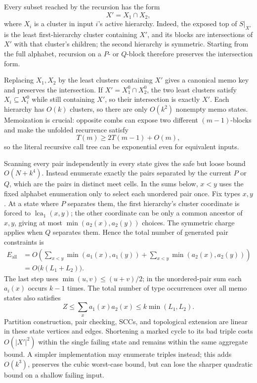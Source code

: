 Every subset reached by the recursion has the form
\begin{equation}
  X'=X_1\cap X_2,
 \label{eq:eta-cluster-intersection}
\end{equation}
where \(X_i\) is a cluster in input \(i\)'s active hierarchy.  Indeed, the
exposed top of \(S|_{X'}\) is the least first-hierarchy cluster containing
\(X'\), and its blocks are intersections of \(X'\) with that cluster's
children; the second hierarchy is symmetric.  Starting from the full
alphabet, recursion on a \(P\)- or \(Q\)-block therefore preserves the
intersection form.

Replacing \(X_1,X_2\) by the least clusters containing \(X'\) gives a
canonical memo key and preserves the intersection.  If
\(X'=X_1^0\cap X_2^0\), the two least clusters satisfy
\(X_i\subseteq X_i^0\) while still containing \(X'\), so their intersection
is exactly \(X'\).  Each hierarchy has \(O(k)\) clusters, so there are only
\(O(k^2)\) nonempty memo states.  Memoization is crucial:
opposite combs can expose two different \((m-1)\)-blocks and make the unfolded
recurrence satisfy
\begin{equation}
  T(m)\ge2T(m-1)+O(m),
 \label{eq:eta-unmemoized}
\end{equation}
so the literal recursive call tree can be exponential even for equivalent
inputs.

Scanning every pair independently in every state gives the safe but loose
bound \(O(N+k^4)\).  Instead enumerate exactly the pairs separated by the
current \(P\) or \(Q\), which are the pairs in distinct meet cells.  In the
sums below, \(x<y\) uses the fixed alphabet enumeration only to select each
unordered pair once.  Fix types \(x,y\).  At a state where \(P\) separates
them, the first hierarchy's
cluster coordinate is forced to \(\operatorname{lca}_1(x,y)\); the other
coordinate can be only a common ancestor of \(x,y\), giving at most
\(\min(a_2(x),a_2(y))\) choices.  The symmetric charge applies when \(Q\)
separates them.  Hence the total number of generated pair constraints is
\begin{equation}
\begin{aligned}
 E_{\mathrm{all}}
 &=O\!\left(
   \sum_{x<y}\min(a_1(x),a_1(y))
   +\sum_{x<y}\min(a_2(x),a_2(y))\right)\\
 &=O\bigl(k(L_1+L_2)\bigr).
\end{aligned}
\label{eq:eta-edge-charge}
\end{equation}
The last step uses \(\min(u,v)\le(u+v)/2\); in the unordered-pair sum each
\(a_i(x)\) occurs \(k-1\) times.  The total number of type occurrences over
all memo states also satisfies
\begin{equation}
 Z\le\sum_x a_1(x)a_2(x)
   \le k\min(L_1,L_2).
 \label{eq:eta-vertex-charge}
\end{equation}
Partition construction, pair checking, SCCs, and topological extension are
linear in these state vertices and edges.  Shortening a marked cycle to its
bad triple costs \(O(|X'|^2)\) within the single failing state and remains
within the same aggregate bound.  A simpler implementation may enumerate
triples instead; this adds \(O(k^3)\), preserves the cubic worst-case bound,
but can lose the sharper quadratic bound on a shallow failing input.

